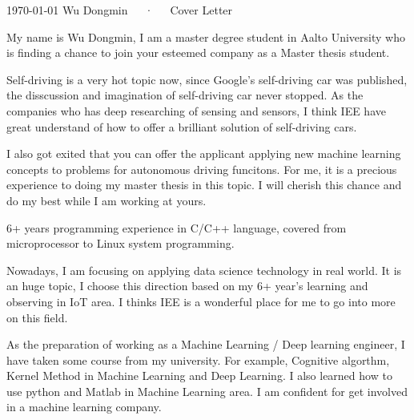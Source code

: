 \documentclass[11pt, a4paper]{awesome-cv}
\begin{document}
\makecvheader[R]

\makecvfooter
  {\today}
  {Wu Dongmin~~~·~~~Cover Letter}
  {}

\makelettertitle

\begin{cvletter}

My name is Wu Dongmin, I am a master degree student in Aalto University who is finding a 
chance to join your esteemed company as a Master thesis student.

   



Self-driving is a very hot topic now, since Google's self-driving car was published, the disscussion and imagination of self-driving car never stopped.
As the companies who has deep researching of sensing and sensors, I think IEE have great understand of 
how to offer a brilliant solution of self-driving cars.

I also got exited that you can offer the applicant applying new machine learning concepts to problems for autonomous driving funcitons.
For me, it is a precious experience to doing my master thesis in this topic. I will cherish this chance and do my best while I am working at yours.

6+ years programming experience in C/C++ language, covered from microprocessor to Linux system programming.

Nowadays, I am focusing on applying data science technology in real world. 
It is an huge topic, I choose this direction based on my 6+ year's learning and observing in IoT area. 
I thinks IEE is a wonderful place for me to go into more on this field. 

As the preparation of working as a Machine Learning / Deep learning engineer, I have taken some course from my university.
For example, Cognitive algorthm, Kernel Method in Machine Learning and Deep Learning. I also learned how to use python and Matlab in 
Machine Learning area. I am confident for get involved in a machine learning company.


\end{cvletter}


\makeletterclosing
\end{document}
